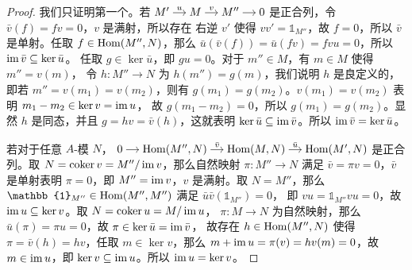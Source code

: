 \begin{proof}
  我们只证明第一个。若 
  $
  \begin{tikzcd}[column sep=small,cramped]
    M'\arrow[r,"u"] & M\arrow[r,"v"] & M''\arrow[r] & 0
  \end{tikzcd}  
  $
  是正合列，令 $\bar v(f)=f v=0$，$v$ 是满射，所以存在
  右逆 $v'$ 使得 $vv'=\mathbb{1}_{M''}$，故 $f=0$，所以
  $\bar v$ 是单射。任取 $f\in\operatorname{Hom}(M'',N)$，那么
  $\bar{u}(\bar{v}(f))=\bar u(fv)=fvu=0$，所以 $\operatorname{im} \bar v\subseteq\ker\bar u$。
  任取 $g\in\ker\bar u$，即 $gu=0$。对于 $m''\in M$，有 $m\in M$ 使得 $m''=v(m)$，
  令 $h:M''\to N$ 为 $h(m'')=g(m)$，我们说明 $h$ 是良定义的，
  即若 $m''=v(m_1)=v(m_2)$，则有 $g(m_1)=g(m_2)$。$v(m_1)=v(m_2)$ 表明 $m_1-m_2\in \ker v=\operatorname{im} u$，
  故 $g(m_1-m_2)=0$，所以 $g(m_1)=g(m_2)$。显然 $h$ 是同态，并且 $g=hv=\bar{v}(h)$，这就表明
  $\ker\bar u\subseteq\operatorname{im}\bar v$。所以 $\operatorname{im}\bar v=\ker\bar u$。

  若对于任意 $A$-模 $N$，
  $
  \begin{tikzcd}[column sep=small,cramped]
    0\arrow[r] & \Hom(M'',N)\arrow[r,"\bar v"] &
    \Hom(M,N) \arrow[r,"\bar u"] & \Hom(M',N)
  \end{tikzcd}  
  $
  是正合列。取 $N=\operatorname{coker} v=M''/\operatorname{im} v$，那么自然映射 $\pi:M''\to N$ 满足
  $\bar{v}=\pi v=0$，$\bar v$ 是单射表明 $\pi=0$，即 $M''=\operatorname{im} v$，$v$ 是满射。取
  $N=M''$，那么 $\mathbb{1}_{M''}\in\Hom(M'',M'')$ 满足 $\bar{u}\bar v(\mathbb{1}_{M''})=0$，
  即 $vu=\mathbb{1}_{M''}vu=0$，故 $\operatorname{im} u\subseteq\ker v$。取 $N=\operatorname{coker} u=M/\operatorname{im} u$，
  $\pi:M\to N$ 为自然映射，那么 $\bar u(\pi)=\pi u=0$，故 $\pi\in\ker\bar u=\operatorname{im} \bar v$，
  故存在 $h\in\operatorname{Hom}(M'',N)$ 使得 $\pi=\bar v(h)=hv$，任取 $m\in\ker v$，那么
  $m+\operatorname{im} u=\pi(v)=hv(m)=0$，故 $m\in\operatorname{im} u$，即 $\ker v\subseteq\operatorname{im} u$。所以 $\operatorname{im} u=\ker v$。
\end{proof}

